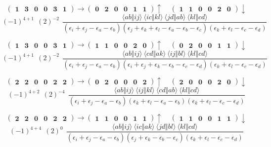 \documentclass[12pt,oneside,a4paper,fleqn]{article}
\begin{document}
\[ \boldsymbol{ \begin{pmatrix} 1 & 3 & 0 & 0 & 3 & 1 \end{pmatrix} \rightarrow \begin{pmatrix} 0 & 2 & 0 & 0 & 1 & 1 \end{pmatrix} \uparrow~~~~~\begin{pmatrix} 1 & 1 & 0 & 0 & 2 & 0 \end{pmatrix} \downarrow } \]
$$(-1)^{4+1}~~(2)^{-2}~~\frac{\langle ab \Vert ij \rangle ~\langle ic \Vert kl \rangle ~\langle jd \Vert ab \rangle ~\langle kl \Vert cd \rangle }{(\epsilon_i +\epsilon_j -\epsilon_a -\epsilon_b ) (\epsilon_j +\epsilon_k +\epsilon_l -\epsilon_a -\epsilon_b -\epsilon_c ) (\epsilon_k +\epsilon_l -\epsilon_c -\epsilon_d ) }$$

\[ \boldsymbol{ \begin{pmatrix} 1 & 3 & 0 & 0 & 3 & 1 \end{pmatrix} \rightarrow \begin{pmatrix} 1 & 1 & 0 & 0 & 2 & 0 \end{pmatrix} \uparrow~~~~~\begin{pmatrix} 0 & 2 & 0 & 0 & 1 & 1 \end{pmatrix} \downarrow } \]
$$(-1)^{4+1}~~(2)^{-2}~~\frac{\langle ab \Vert ij \rangle ~\langle cd \Vert ak \rangle ~\langle ij \Vert bl \rangle ~\langle kl \Vert cd \rangle }{(\epsilon_i +\epsilon_j -\epsilon_a -\epsilon_b ) (\epsilon_i +\epsilon_j +\epsilon_k -\epsilon_b -\epsilon_c -\epsilon_d ) (\epsilon_k +\epsilon_l -\epsilon_c -\epsilon_d ) }$$

\[ \boldsymbol{ \begin{pmatrix} 2 & 2 & 0 & 0 & 2 & 2 \end{pmatrix} \rightarrow \begin{pmatrix} 0 & 2 & 0 & 0 & 0 & 2 \end{pmatrix} \uparrow~~~~~\begin{pmatrix} 2 & 0 & 0 & 0 & 2 & 0 \end{pmatrix} \downarrow } \]
$$(-1)^{4+2}~~(2)^{-4}~~\frac{\langle ab \Vert ij \rangle ~\langle ij \Vert kl \rangle ~\langle cd \Vert ab \rangle ~\langle kl \Vert cd \rangle }{(\epsilon_i +\epsilon_j -\epsilon_a -\epsilon_b ) (\epsilon_k +\epsilon_l -\epsilon_a -\epsilon_b ) (\epsilon_k +\epsilon_l -\epsilon_c -\epsilon_d ) }$$

\[ \boldsymbol{ \begin{pmatrix} 2 & 2 & 0 & 0 & 2 & 2 \end{pmatrix} \rightarrow \begin{pmatrix} 1 & 1 & 0 & 0 & 1 & 1 \end{pmatrix} \uparrow~~~~~\begin{pmatrix} 1 & 1 & 0 & 0 & 1 & 1 \end{pmatrix} \downarrow } \]
$$(-1)^{4+4}~~(2)^{0}~~\frac{\langle ab \Vert ij \rangle ~\langle ic \Vert ak \rangle ~\langle jd \Vert bl \rangle ~\langle kl \Vert cd \rangle }{(\epsilon_i +\epsilon_j -\epsilon_a -\epsilon_b ) (\epsilon_j +\epsilon_k -\epsilon_b -\epsilon_c ) (\epsilon_k +\epsilon_l -\epsilon_c -\epsilon_d ) }$$
\end{document}
